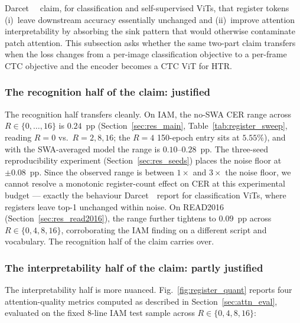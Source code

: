 Darcet~\etal~\cite{darcet2024registers} claim, for classification and self-supervised ViTs, that register tokens (i)~leave downstream accuracy essentially unchanged and (ii)~improve attention interpretability by absorbing the sink pattern that would otherwise contaminate patch attention. This subsection asks whether the same two-part claim transfers when the loss changes from a per-image classification objective to a per-frame CTC objective and the encoder becomes a CTC ViT for HTR.

\subsubsection{The recognition half of the claim: justified}

The recognition half transfers cleanly. On IAM, the no-SWA CER range across $R \in \{0, \ldots, 16\}$ is $0.24$~pp (Section~\ref{sec:res_main}, Table~\ref{tab:register_sweep}, reading $R = 0$ vs.\ $R = 2, 8, 16$; the $R = 4$ 150-epoch entry sits at $5.55\%$), and with the SWA-averaged model the range is $0.10$--$0.28$~pp. The three-seed reproducibility experiment (Section~\ref{sec:res_seeds}) places the noise floor at $\pm 0.08$~pp. Since the observed range is between $1{\times}$ and $3{\times}$ the noise floor, we cannot resolve a monotonic register-count effect on CER at this experimental budget --- exactly the behaviour Darcet~\etal\ report for classification ViTs, where registers leave top-1 unchanged within noise. On READ2016 (Section~\ref{sec:res_read2016}), the range further tightens to $0.09$~pp across $R \in \{0, 4, 8, 16\}$, corroborating the IAM finding on a different script and vocabulary. The recognition half of the claim carries over.

\subsubsection{The interpretability half of the claim: partly justified}

The interpretability half is more nuanced. Fig.~\ref{fig:register_quant} reports four attention-quality metrics computed as described in Section~\ref{sec:attn_eval}, evaluated on the fixed $8$-line IAM test sample across $R \in \{0, 4, 8, 16\}$:

